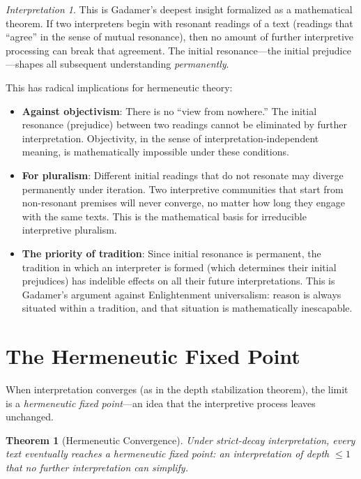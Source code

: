 \documentclass[11pt,openany]{book}
\theoremstyle{definition}
\theoremstyle{plain}
\newtheorem{theorem}[axiom]{Theorem}
\theoremstyle{remark}
\newtheorem{interpretation}[axiom]{Interpretation}
\begin{document}
\begin{interpretation}
This is Gadamer's deepest insight formalized as a mathematical theorem. If two interpreters begin with resonant readings of a text (readings that ``agree'' in the sense of mutual resonance), then no amount of further interpretive processing can break that agreement. The initial resonance---the initial prejudice---shapes all subsequent understanding \emph{permanently}.

This has radical implications for hermeneutic theory:
\begin{itemize}
\item \textbf{Against objectivism}: There is no ``view from nowhere.'' The initial resonance (prejudice) between two readings cannot be eliminated by further interpretation. Objectivity, in the sense of interpretation-independent meaning, is mathematically impossible under these conditions.
\item \textbf{For pluralism}: Different initial readings that do not resonate may diverge permanently under iteration. Two interpretive communities that start from non-resonant premises will never converge, no matter how long they engage with the same texts. This is the mathematical basis for irreducible interpretive pluralism.
\item \textbf{The priority of tradition}: Since initial resonance is permanent, the tradition in which an interpreter is formed (which determines their initial prejudices) has indelible effects on all their future interpretations. This is Gadamer's argument against Enlightenment universalism: reason is always situated within a tradition, and that situation is mathematically inescapable.
\end{itemize}
\end{interpretation}

\section{The Hermeneutic Fixed Point}

When interpretation converges (as in the depth stabilization theorem), the limit is a \emph{hermeneutic fixed point}---an idea that the interpretive process leaves unchanged.

\begin{theorem}[Hermeneutic Convergence]
Under strict-decay interpretation, every text eventually reaches a hermeneutic fixed point: an interpretation of depth $\leq 1$ that no further interpretation can simplify.
\end{theorem}
\end{document}
